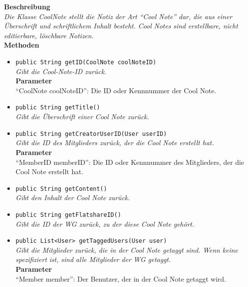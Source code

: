 	\textbf{Beschreibung} \\
	\textit{Die Klasse CoolNote stellt die Notiz der Art “Cool Note” dar, die aus einer Überschrift und schriftlichem Inhalt besteht. Cool Notes sind erstellbare, nicht editierbare, löschbare Notizen.} \\

	\textbf{Methoden}
	\begin{itemize}
		\item\texttt{{public String getID(CoolNote coolNoteID)}}\\
		\textit{Gibt die Cool-Note-ID zurück.}\\
		\textbf{Parameter}\\
		“CoolNote coolNoteID”: Die ID oder Kennnummer der Cool Note.\\
		
		\item\texttt{{public String getTitle()}}\\
		\textit{Gibt die Überschrift einer Cool Note zurück.}\\
		
		\item\texttt{{public String getCreatorUserID(User userID)}}\\
		\textit{Gibt die ID des Mitglieders zurück, der die Cool Note erstellt hat.}\\
		\textbf{Parameter}\\
		“MemberID memberID”: Die ID oder Kennnummer des Mitglieders, der die Cool Note erstellt hat.\\
		
		\item\texttt{{public String getContent()}}\\
		\textit{Gibt den Inhalt der Cool Note zurück.}\\
		
		\item\texttt{{public String getFlatshareID()}}\\
		\textit{Gibt die ID der WG zurück, zu der diese Cool Note gehört.}\\
		
		\item\texttt{{public List<User> getTaggedUsers(User user)}}\\
		\textit{Gibt die Mitglieder zurück, die in der Cool Note getaggt sind. Wenn keine spezifiziert ist, sind alle Mitglieder der WG getaggt.}\\
		\textbf{Parameter}\\
		“Member member”: Der Benutzer, der in der Cool Note getaggt wird.\\
		

\end{itemize}

